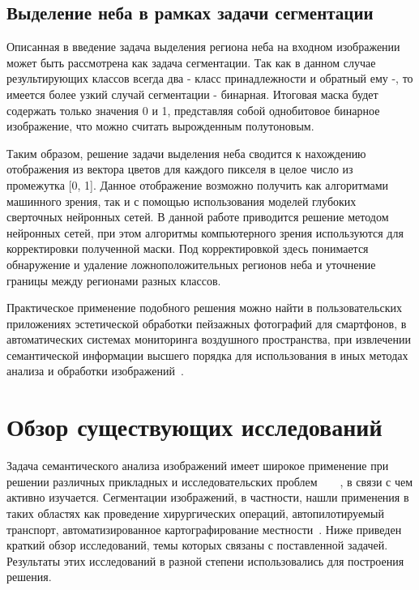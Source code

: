 \subsection{Выделение неба в рамках задачи сегментации}

Описанная в введение задача выделения региона неба на входном изображении может быть рассмотрена как задача сегментации. Так как в данном случае результирующих классов всегда два - класс принадлежности и обратный ему -, то имеется более узкий случай сегментации - бинарная. Итоговая маска будет содержать только значения 0 и 1, представляя собой однобитовое бинарное изображение, что можно считать вырожденным полутоновым.

Таким образом, решение задачи выделения неба сводится к нахождению отображения из вектора цветов для каждого пикселя в целое число из промежутка [0, 1]. Данное отображение возможно получить как алгоритмами машинного зрения, так и с помощью использования моделей глубоких сверточных нейронных сетей. В данной работе приводится решение методом нейронных сетей, при этом алгоритмы компьютерного зрения используются для корректировки полученной маски. Под корректировкой здесь понимается обнаружение и удаление ложноположительных регионов неба и уточнение границы между регионами разных классов.

Практическое применение подобного решения можно найти в пользовательских приложениях эстетической обработки пейзажных фотографий для смартфонов, в автоматических системах мониторинга воздушного пространства, при извлечении семантической информации высшего порядка для использования в иных методах анализа и обработки изображений~\autocite{7415405}.

\section{Обзор существующих исследований}

Задача семантического анализа изображений имеет широкое применение при решении различных прикладных и исследовательских проблем~\autocite{maier2018gentle}~\autocite{pan2019image}~\autocite{stabinger2020evaluating}~\autocite{li2015brief}, в связи с чем активно изучается. Сегментации изображений, в частности, нашли применения в таких областях как проведение хирургических операций, автопилотируемый транспорт, автоматизированное картографирование местности~\autocite{liu2018recent}. Ниже приведен краткий обзор исследований, темы которых связаны с поставленной задачей. Результаты этих исследований в разной степени использовались для построения решения. 

